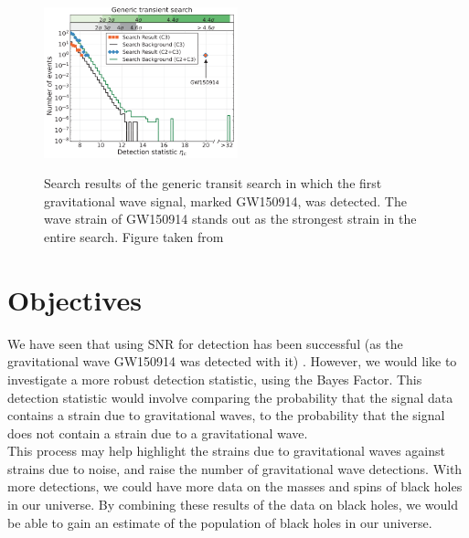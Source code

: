\documentclass{article}
\begin{document}
\begin{figure}[h]
	\caption{Search results of the generic transit search in which the first gravitational wave signal, marked GW150914, was detected. The wave strain of GW150914 stands out as the strongest strain in the entire search. Figure taken from \cite{DetectionPaper}}
	\centering
	\includegraphics[width=0.5\textwidth]{DetectionInGenericTransientSearch} \label{Fig:Detection}
\end{figure}

 
 
 
 \section{Objectives}
 
 We have seen that using SNR for detection has been successful (as the gravitational wave GW150914 was detected with it) \cite{DetectionPaper}. However, we would like to investigate a more robust detection statistic, using the Bayes Factor. This detection statistic would involve comparing the probability that the signal data contains a strain due to gravitational waves, to the probability that the signal does not contain a strain due to a gravitational wave.\\
 
 This process may help highlight the strains due to gravitational waves against strains due to noise, and raise the number of gravitational wave detections. With more detections, we could have more data on the masses and spins of black holes in our universe. By combining these results of the data on black holes, we would be able to gain an estimate of the population of black holes in our universe. 
 
\end{document}
